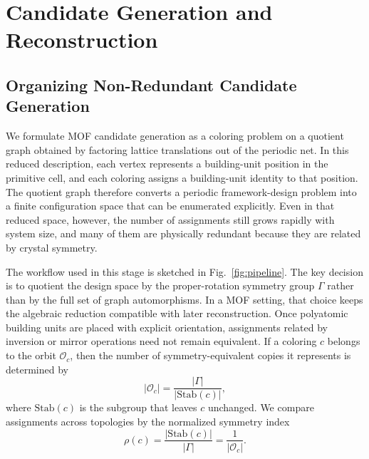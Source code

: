 \documentclass[pdflatex,sn-mathphys-num]{sn-jnl}
\theoremstyle{thmstyleone}%
\begin{document}
\section*{Candidate Generation and Reconstruction}

\subsection*{Organizing Non-Redundant Candidate Generation}
\label{sec:theory}
We formulate MOF candidate generation as a coloring problem on a quotient graph obtained by factoring lattice translations out of the periodic net. In this reduced description, each vertex represents a building-unit position in the primitive cell, and each coloring assigns a building-unit identity to that position. The quotient graph therefore converts a periodic framework-design problem into a finite configuration space that can be enumerated explicitly. Even in that reduced space, however, the number of assignments still grows rapidly with system size, and many of them are physically redundant because they are related by crystal symmetry.

The workflow used in this stage is sketched in Fig.~\ref{fig:pipeline}. The key decision is to quotient the design space by the proper-rotation symmetry group $\Gamma$ rather than by the full set of graph automorphisms. In a MOF setting, that choice keeps the algebraic reduction compatible with later reconstruction. Once polyatomic building units are placed with explicit orientation, assignments related by inversion or mirror operations need not remain equivalent. If a coloring $c$ belongs to the orbit $\mathcal{O}_c$, then the number of symmetry-equivalent copies it represents is determined by
\begin{equation}
|\mathcal{O}_c| = \frac{|\Gamma|}{|\mathrm{Stab}(c)|},
\end{equation}
where $\mathrm{Stab}(c)$ is the subgroup that leaves $c$ unchanged. We compare assignments across topologies by the normalized symmetry index
\begin{equation}
\rho(c) = \frac{|\mathrm{Stab}(c)|}{|\Gamma|} = \frac{1}{|\mathcal{O}_c|}.
\end{equation}
\end{document}
